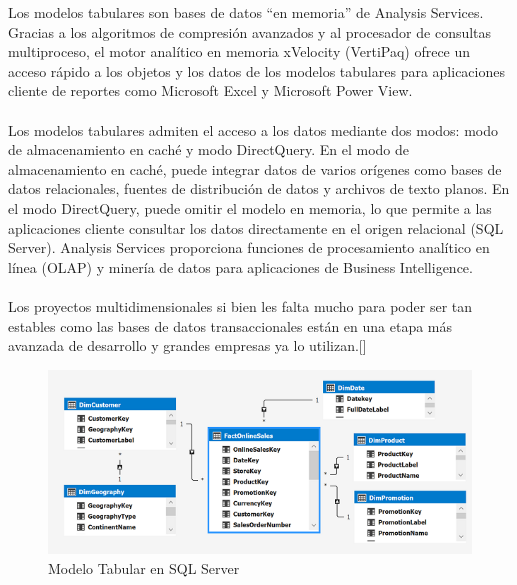 \documentclass[11pt,a4paper]{article}
\begin{document}
	 	Los modelos tabulares son bases de datos “en memoria” de Analysis Services. Gracias a los algoritmos de compresión avanzados y al procesador de consultas multiproceso, el motor analítico en memoria xVelocity (VertiPaq) ofrece un acceso rápido a los objetos y los datos de los modelos tabulares para aplicaciones cliente de reportes como Microsoft Excel y Microsoft Power View.\\
	 	\\
	 	Los modelos tabulares admiten el acceso a los datos mediante dos modos: modo de almacenamiento en caché y modo DirectQuery. En el modo de almacenamiento en caché, puede integrar datos de varios orígenes como bases de datos relacionales, fuentes de distribución de datos y archivos de texto planos. En el modo DirectQuery, puede omitir el modelo en memoria, lo que permite a las aplicaciones cliente consultar los datos directamente en el origen relacional (SQL Server).
	 	Analysis Services proporciona funciones de procesamiento analítico en línea (OLAP) y minería de datos para aplicaciones de Business Intelligence.\\
	 	\\
	 		Los proyectos multidimensionales si bien les falta mucho para poder ser tan estables como las bases de datos transaccionales están en una etapa más avanzada de desarrollo y grandes empresas ya lo utilizan.[\cite{sanchez2015modelacion}]
	 	
	 	\begin{figure}[!ht]
	 		\begin{center}
	 			\includegraphics[scale=1.5]{./Imagenes/img01}	
	 			\caption{Modelo Tabular en SQL Server}		
	 		\end{center}
	 	\end{figure}
	 	
\end{document}
